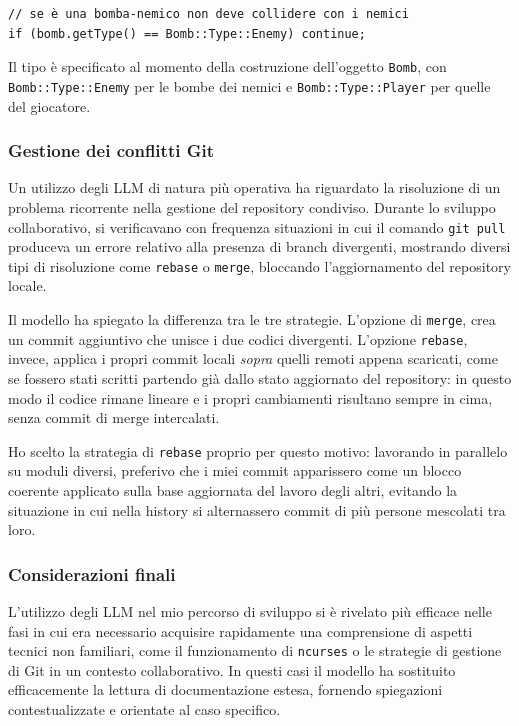 \documentclass[a4paper,11pt]{article}
\begin{document}
\begin{verbatim}
// se è una bomba-nemico non deve collidere con i nemici
if (bomb.getType() == Bomb::Type::Enemy) continue;
\end{verbatim}
 
Il tipo è specificato al momento della costruzione dell'oggetto \texttt{Bomb},
con \texttt{Bomb::Type::Enemy} per le bombe dei nemici e \texttt{Bomb::Type::Player}
per quelle del giocatore.
 
\subsubsection{Gestione dei conflitti Git}
 
Un utilizzo degli LLM di natura più operativa ha riguardato la risoluzione di un
problema ricorrente nella gestione del repository condiviso. Durante lo sviluppo
collaborativo, si verificavano con frequenza situazioni in cui il comando
\texttt{git pull} produceva un errore relativo alla presenza di branch divergenti,
mostrando diversi tipi di risoluzione come \texttt{rebase} o \texttt{merge},
bloccando l'aggiornamento del repository locale.
 
Il modello ha spiegato la differenza tra le tre strategie. L'opzione
di \texttt{merge}, crea un commit aggiuntivo che unisce i due codici divergenti. L'opzione
\texttt{rebase}, invece, applica i propri commit locali \textit{sopra}
quelli remoti appena scaricati, come se fossero stati scritti partendo già dallo
stato aggiornato del repository: in questo modo il codice rimane lineare e i propri
cambiamenti risultano sempre in cima, senza commit di merge intercalati.
 
Ho scelto la strategia di \texttt{rebase} proprio per questo motivo: lavorando in
parallelo su moduli diversi, preferivo che i miei commit apparissero come un blocco
coerente applicato sulla base aggiornata del lavoro degli altri, evitando la
situazione in cui nella history si alternassero commit di più persone mescolati tra
loro. 

\subsubsection{Considerazioni finali}
 
L'utilizzo degli LLM nel mio percorso di sviluppo si è rivelato più efficace nelle
fasi in cui era necessario acquisire rapidamente una comprensione di aspetti tecnici
non familiari, come il funzionamento di \texttt{ncurses} o le strategie di gestione
di Git in un contesto collaborativo. In questi casi il modello ha sostituito
efficacemente la lettura di documentazione estesa, fornendo spiegazioni
contestualizzate e orientate al caso specifico.
 
\end{document}
